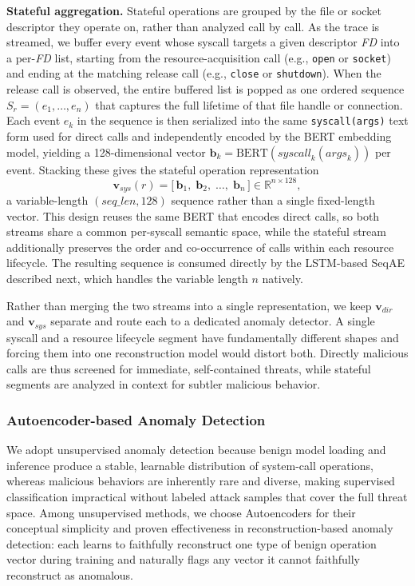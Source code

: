 \noindent \textbf{Stateful aggregation.}
Stateful operations are grouped by the file or socket descriptor they operate on, rather than analyzed call by call. As the trace is streamed, we buffer every event whose syscall targets a given descriptor \textit{FD} into a per-\textit{FD} list, starting from the resource-acquisition call (e.g., \texttt{open} or \texttt{socket}) and ending at the matching release call (e.g., \texttt{close} or \texttt{shutdown}). When the release call is observed, the entire buffered list is popped as one ordered sequence $S_r = (e_1, \dots, e_{n})$ that captures the full lifetime of that file handle or connection. Each event $e_k$ in the sequence is then serialized into the same \texttt{syscall(args)} text form used for direct calls and independently encoded by the BERT embedding model, yielding a 128-dimensional vector $\mathbf{b}_k = \text{BERT}(\textit{syscall}_k(\textit{args}_k))$ per event. Stacking these gives the stateful operation representation
\begin{equation}
\mathbf{v}_{\textit{sys}}(r) = \big[\,\mathbf{b}_1,\; \mathbf{b}_2,\; \dots,\; \mathbf{b}_{n}\,\big] \in \mathbb{R}^{n \times 128},
\end{equation}
a variable-length $(\textit{seq\_len}, 128)$ sequence rather than a single fixed-length vector. This design reuses the same BERT that encodes direct calls, so both streams share a common per-syscall semantic space, while the stateful stream additionally preserves the order and co-occurrence of calls within each resource lifecycle. The resulting sequence is consumed directly by the LSTM-based SeqAE described next, which handles the variable length $n$ natively.

Rather than merging the two streams into a single representation, we keep $\mathbf{v}_{\textit{dir}}$ and $\mathbf{v}_{\textit{sys}}$ separate and route each to a dedicated anomaly detector. A single syscall and a resource lifecycle segment have fundamentally different shapes and forcing them into one reconstruction model would distort both. Directly malicious calls are thus screened for immediate, self-contained threats, while stateful segments are analyzed in context for subtler malicious behavior.

\subsubsection{Autoencoder-based Anomaly Detection}

We adopt unsupervised anomaly detection because benign model loading and inference produce a stable, learnable distribution of system-call operations, whereas malicious behaviors are inherently rare and diverse, making supervised classification impractical without labeled attack samples that cover the full threat space. Among unsupervised methods, we choose Autoencoders for their conceptual simplicity and proven effectiveness in reconstruction-based anomaly detection: each learns to faithfully reconstruct one type of benign operation vector during training and naturally flags any vector it cannot faithfully reconstruct as anomalous.

